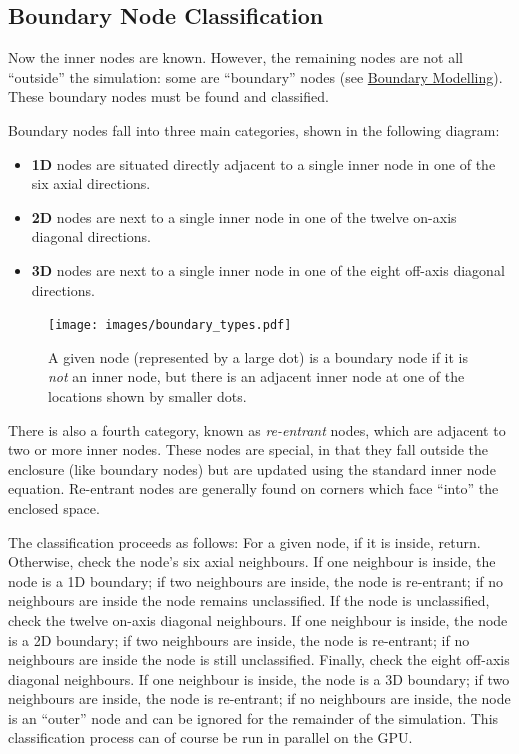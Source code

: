 \documentclass[]{scrreprt}
\providecommand{\tightlist}{%
  \setlength{\itemsep}{0pt}\setlength{\parskip}{0pt}}
\begin{document}
\subsection{Boundary Node
Classification}\label{boundary-node-classification}

Now the inner nodes are known. However, the remaining nodes are not all
``outside'' the simulation: some are ``boundary'' nodes (see
\href{\%7B\%7B\%20site.baseurl\%20\%7D\%7D\%7B\%\%20link\%20boundary.md\%20\%\%7D}{Boundary
Modelling}). These boundary nodes must be found and classified.

Boundary nodes fall into three main categories, shown in the following
diagram\text{ (\ref{fig:boundary_types})}:

\begin{itemize}
\tightlist
\item
  \textbf{1D} nodes are situated directly adjacent to a single inner
  node in one of the six axial directions.
\item
  \textbf{2D} nodes are next to a single inner node in one of the twelve
  on-axis diagonal directions.
\item
  \textbf{3D} nodes are next to a single inner node in one of the eight
  off-axis diagonal directions.
\end{itemize}

\begin{figure}[htbp]
\centering
\texttt{[image: images/boundary\_types.pdf]}
\caption{A given node (represented by a large dot) is a boundary node if
it is \emph{not} an inner node, but there is an adjacent inner node at
one of the locations shown by smaller dots.\label{fig:boundary_types}}
\end{figure}

There is also a fourth category, known as \emph{re-entrant} nodes, which
are adjacent to two or more inner nodes. These nodes are special, in
that they fall outside the enclosure (like boundary nodes) but are
updated using the standard inner node equation. Re-entrant nodes are
generally found on corners which face ``into'' the enclosed space.

The classification proceeds as follows: For a given node, if it is
inside, return. Otherwise, check the node's six axial neighbours. If one
neighbour is inside, the node is a 1D boundary; if two neighbours are
inside, the node is re-entrant; if no neighbours are inside the node
remains unclassified. If the node is unclassified, check the twelve
on-axis diagonal neighbours. If one neighbour is inside, the node is a
2D boundary; if two neighbours are inside, the node is re-entrant; if no
neighbours are inside the node is still unclassified. Finally, check the
eight off-axis diagonal neighbours. If one neighbour is inside, the node
is a 3D boundary; if two neighbours are inside, the node is re-entrant;
if no neighbours are inside, the node is an ``outer'' node and can be
ignored for the remainder of the simulation. This classification process
can of course be run in parallel on the GPU.
\end{document}

